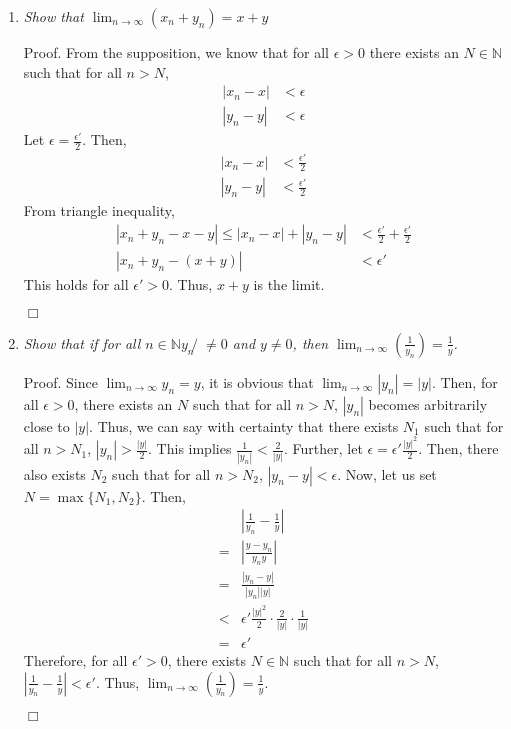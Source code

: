 \documentclass[
]{article}
\begin{document}
\begin{enumerate}
\item \textit{Show that $\lim _{n \to \infty} (x_n + y_n) = x + y$}  
  
Proof. From the supposition, we know that for all $\epsilon >0$ there exists an $N \in \mathbb{N}$ such that for all $n>N$,
\[\begin{aligned}|x_n - x| &< \epsilon  \\ |y_n - y| &< \epsilon\end{aligned}\]
Let $\epsilon = \frac{\epsilon'}{2}$. Then, 
\[\begin{aligned}|x_n - x| &< \frac{\epsilon'}{2} \\ |y_n - y| &< \frac{\epsilon'}{2}\end{aligned}\] 
From triangle inequality, 
\[\begin{aligned}|x_n + y_n - x - y| \leq |x_n - x| + |y_n - y| &< \frac{\epsilon'}{2}+ \frac{\epsilon'}{2} \\ |x_n + y_n - (x + y)|&< \epsilon' \end{aligned}\]
This holds for all $\epsilon' > 0$. Thus, $x + y$ is the limit. 

\hfill $\Box$  
 
\item \textit{Show that if for all $n \in \mathbb{N} y_n ̸\neq 0$ and $y \neq 0$, then $\lim_{n\to \infty}(\frac{1}{y_n}) = \frac{1}{y}$.}  
  
Proof. Since $\lim _{n \to \infty} y_n = y$, it is obvious that $\lim _{n \to \infty} |y_n| = |y|$. Then, for all $\epsilon > 0$, there exists an $N$ such that for all $n > N$, $|y_n|$ becomes arbitrarily close to $|y|$. Thus, we can say with certainty that there exists $N_1$ such that for all $n>N_1$, $|y_n| > \frac{|y|}{2}$. This implies $\frac{1}{|y_n|} < \frac{2}{|y|}$.  
Further, let $\epsilon = \epsilon' \frac{|y|^2}{2}$. Then, there also exists $N_2$ such that for all $n > N_2$, $|y_n - y| < \epsilon$.  
Now, let us set $N=\max \{ N_1, N_2\}$. Then, 
\[\begin{aligned}&|\frac{1}{y_n} - \frac{1}{y}| 
\\ = &|\frac{y - y_n}{y_n y}| 
\\ = &\frac{|y_n - y|}{|y_n||y|} 
\\ < &\epsilon' \frac{|y|^2}{2} \cdot \frac{2}{|y|} \cdot \frac{1}{|y|}
\\ = &\epsilon'
\end{aligned}\]
Therefore, for all $\epsilon'>0$, there exists $N \in \mathbb{N}$ such that for all $n > N$, $|\frac{1}{y_n} - \frac{1}{y}| < \epsilon'$. Thus,  $\lim_{n\to \infty}(\frac{1}{y_n}) = \frac{1}{y}$.

\hfill $\Box$ 
\end{enumerate}
\end{document}
